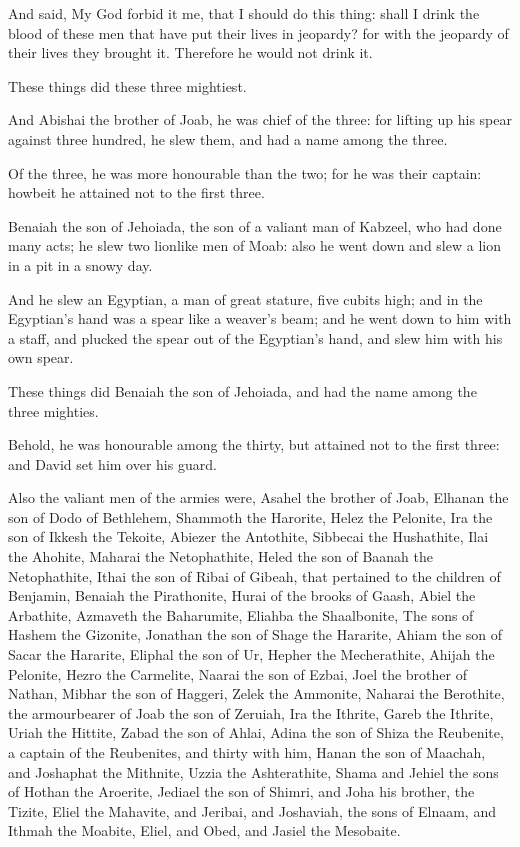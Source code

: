\verse And said, My God forbid it me, that I should do this thing: shall I drink the blood of these men that have put their lives in jeopardy? for with the jeopardy of their lives they brought it.  Therefore he would not drink it.

These things did these three mightiest.

\verse And Abishai the brother of Joab, he was chief of the three: for lifting up his spear against three hundred, he slew them, and had a name among the three.

\verse Of the three, he was more honourable than the two; for he was their captain: howbeit he attained not to the first three.

\verse Benaiah the son of Jehoiada, the son of a valiant man of Kabzeel, who had done many acts; he slew two lionlike men of Moab: also he went down and slew a lion in a pit in a snowy day.

\verse And he slew an Egyptian, a man of great stature, five cubits high; and in the Egyptian's hand was a spear like a weaver's beam; and he went down to him with a staff, and plucked the spear out of the Egyptian's hand, and slew him with his own spear.

\verse These things did Benaiah the son of Jehoiada, and had the name among the three mighties.

\verse Behold, he was honourable among the thirty, but attained not to the first three: and David set him over his guard.

\verse Also the valiant men of the armies were, Asahel the brother of Joab, Elhanan the son of Dodo of Bethlehem, \verse Shammoth the Harorite, Helez the Pelonite, \verse Ira the son of Ikkesh the Tekoite, Abiezer the Antothite, \verse Sibbecai the Hushathite, Ilai the Ahohite, \verse Maharai the Netophathite, Heled the son of Baanah the Netophathite, \verse Ithai the son of Ribai of Gibeah, that pertained to the children of Benjamin, Benaiah the Pirathonite, \verse Hurai of the brooks of Gaash, Abiel the Arbathite, \verse Azmaveth the Baharumite, Eliahba the Shaalbonite, \verse The sons of Hashem the Gizonite, Jonathan the son of Shage the Hararite, \verse Ahiam the son of Sacar the Hararite, Eliphal the son of Ur, \verse Hepher the Mecherathite, Ahijah the Pelonite, \verse Hezro the Carmelite, Naarai the son of Ezbai, \verse Joel the brother of Nathan, Mibhar the son of Haggeri, \verse Zelek the Ammonite, Naharai the Berothite, the armourbearer of Joab the son of Zeruiah, \verse Ira the Ithrite, Gareb the Ithrite, \verse Uriah the Hittite, Zabad the son of Ahlai, \verse Adina the son of Shiza the Reubenite, a captain of the Reubenites, and thirty with him, \verse Hanan the son of Maachah, and Joshaphat the Mithnite, \verse Uzzia the Ashterathite, Shama and Jehiel the sons of Hothan the Aroerite, \verse Jediael the son of Shimri, and Joha his brother, the Tizite, \verse Eliel the Mahavite, and Jeribai, and Joshaviah, the sons of Elnaam, and Ithmah the Moabite, \verse Eliel, and Obed, and Jasiel the Mesobaite.


